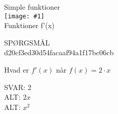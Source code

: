 \documentclass[]{article}
\newenvironment{question}[2]{SPØRGSMÅL\\}{\hspace{50px}}
\newcommand{\name}[1]{{\huge #1}\\}
\newcommand{\tag}[1]{#1}
\newcommand{\cover}[1]{\texttt{[image: \#1]}\\}
\newcommand{\image}[1]{\texttt{[image: \#1]}\\}
\newcommand{\answer}[1]{{\color{green} SVAR: #1}\\}
\newcommand{\alt}[1]{{\color{red} ALT: #1}\\}
\begin{document}
\name{Simple funktioner}
\cover{tangent.png}
\tag{Funktioner}
\tag{f'(x)}

\begin{question}{multi}\id{d20cf3ed30d54facaaf94a1f17bc06cb}
    
Hvad er $f'(x)$ når $f(x)=2\cdot x$


\answer{2}
\alt{$2x$}
\alt{$x^2$}

\end{question}
\end{document}
